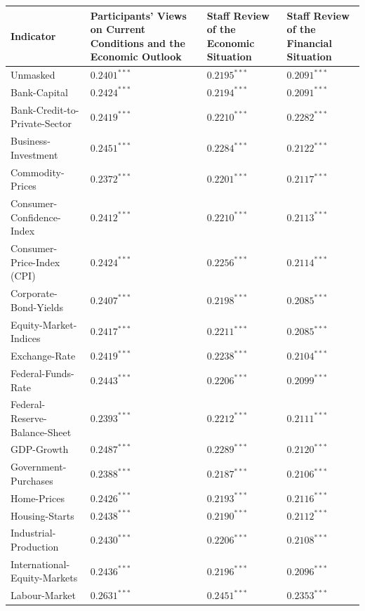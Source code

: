 \begin{table}[htbp]
\centering
\scriptsize
\begin{threeparttable}
\begin{tabular}{p{3.6cm} p{4.3cm} p{3.1cm} p{3.1cm}}
\toprule
\textbf{Indicator} & 
\textbf{Participants' Views on Current Conditions and the Economic Outlook} & 
\textbf{Staff Review of the Economic Situation} & 
\textbf{Staff Review of the Financial Situation} \\
\midrule
Unmasked & $0.2401^{***}$ & $0.2195^{***}$ & $0.2091^{***}$ \\
\midrule
Bank-Capital & $0.2424^{***}$ & $0.2194^{***}$ & $0.2091^{***}$ \\
Bank-Credit-to-Private-Sector & $0.2419^{***}$ & $0.2210^{***}$ & $0.2282^{***}$ \\
Business-Investment & $0.2451^{***}$ & $0.2284^{***}$ & $0.2122^{***}$ \\
Commodity-Prices & $0.2372^{***}$ & $0.2201^{***}$ & $0.2117^{***}$ \\
Consumer-Confidence-Index & $0.2412^{***}$ & $0.2210^{***}$ & $0.2113^{***}$ \\
Consumer-Price-Index (CPI) & $0.2424^{***}$ & $0.2256^{***}$ & $0.2114^{***}$ \\
Corporate-Bond-Yields & $0.2407^{***}$ & $0.2198^{***}$ & $0.2085^{***}$ \\
Equity-Market-Indices & $0.2417^{***}$ & $0.2211^{***}$ & $0.2085^{***}$ \\
Exchange-Rate & $0.2419^{***}$ & $0.2238^{***}$ & $0.2104^{***}$ \\
Federal-Funds-Rate & $0.2443^{***}$ & $0.2206^{***}$ & $0.2099^{***}$ \\
Federal-Reserve-Balance-Sheet & $0.2393^{***}$ & $0.2212^{***}$ & $0.2111^{***}$ \\
GDP-Growth & $0.2487^{***}$ & $0.2289^{***}$ & $0.2120^{***}$ \\
Government-Purchases & $0.2388^{***}$ & $0.2187^{***}$ & $0.2106^{***}$ \\
Home-Prices & $0.2426^{***}$ & $0.2193^{***}$ & $0.2116^{***}$ \\
Housing-Starts & $0.2438^{***}$ & $0.2190^{***}$ & $0.2112^{***}$ \\
Industrial-Production & $0.2430^{***}$ & $0.2206^{***}$ & $0.2108^{***}$ \\
International-Equity-Markets & $0.2436^{***}$ & $0.2196^{***}$ & $0.2096^{***}$ \\
Labour-Market & $0.2631^{***}$ & $0.2451^{***}$ & $0.2353^{***}$ \\

\end{tabular}
\end{threeparttable}
\end{table}
